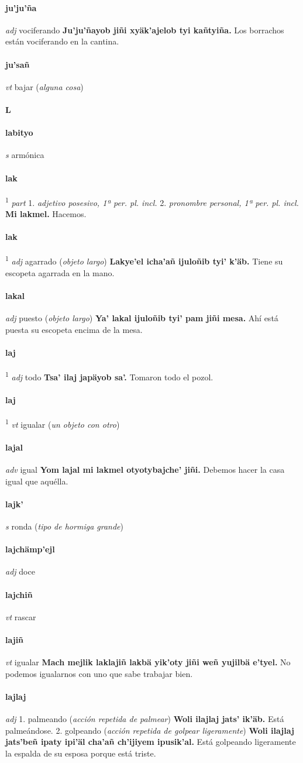 \documentclass{scrbook}
\newcommand{\entry}[1]{\paragraph{#1}}
\newcommand{\alphaletter}[1]{\addsec{#1}}
\newcommand{\onedefinition}[1]{#1.}
\newcommand{\defsuperscript}[1]{\textsuperscript{1}}
\newcommand{\nontranslationdef}[1]{\textit{#1}}
\newcommand{\partofspeech}[1]{\textit{#1}}
\newcommand{\spanishtranslation}[1]{#1}
\newcommand{\clarification}[1]{(\textit{#1})}
\newcommand{\cholexample}[1]{\textbf{#1}}
\newcommand{\exampletranslation}[1]{#1}
\begin{document}
\begin{multicols}{2}
\entry{ju'ju'ña}
\partofspeech{adj}
\spanishtranslation{vociferando}
\cholexample{Ju'ju'ñayob jiñi xyäk'ajelob tyi kañtyiña.}
\exampletranslation{Los borrachos están vociferando en la cantina.}

\entry{ju'sañ}
\partofspeech{vt}
\spanishtranslation{bajar}
\clarification{alguna cosa}

\entry{L}
\alphaletter{L}

\entry{labityo}
\partofspeech{s}
\spanishtranslation{armónica}

\entry{lak}
\defsuperscript{1}
\partofspeech{part}
\onedefinition{1}
\nontranslationdef{adjetivo posesivo, 1ª per. pl. incl.}
\onedefinition{2}
\nontranslationdef{pronombre personal, 1ª per. pl. incl.}
\cholexample{Mi lakmel.}
\exampletranslation{Hacemos.}

\entry{lak}
\defsuperscript{2}
\partofspeech{adj}
\spanishtranslation{agarrado}
\clarification{objeto largo}
\cholexample{Lakye'el icha'añ ijuloñib tyi' k'äb.}
\exampletranslation{Tiene su escopeta agarrada en la mano.}

\entry{lakal}
\partofspeech{adj}
\spanishtranslation{puesto}
\clarification{objeto largo}
\cholexample{Ya' lakal ijuloñib tyi' pam jiñi mesa.}
\exampletranslation{Ahí está puesta su escopeta encima de la mesa.}

\entry{laj}
\defsuperscript{1}
\partofspeech{adj}
\spanishtranslation{todo}
\cholexample{Tsa' ilaj japäyob sa'.}
\exampletranslation{Tomaron todo el pozol.}

\entry{laj}
\defsuperscript{2}
\partofspeech{vt}
\spanishtranslation{igualar}
\clarification{un objeto con otro}

\entry{lajal}
\partofspeech{adv}
\spanishtranslation{igual}
\cholexample{Yom lajal mi lakmel otyotybajche' jiñi.}
\exampletranslation{Debemos hacer la casa igual que aquélla.}

\entry{lajk'}
\partofspeech{s}
\spanishtranslation{ronda}
\clarification{tipo de hormiga grande}

\entry{lajchämp'ejl}
\partofspeech{adj}
\spanishtranslation{doce}

\entry{lajchiñ}
\partofspeech{vt}
\spanishtranslation{rascar}

\entry{lajiñ}
\partofspeech{vt}
\spanishtranslation{igualar}
\cholexample{Mach mejlik laklajiñ lakbä yik'oty jiñi weñ yujilbä e'tyel.}
\exampletranslation{No podemos igualarnos con uno que sabe trabajar bien.}

\entry{lajlaj}
\partofspeech{adj}
\onedefinition{1}
\spanishtranslation{palmeando}
\clarification{acción repetida de palmear}
\cholexample{Woli ilajlaj jats' ik'äb.}
\exampletranslation{Está palmeándose.}
\onedefinition{2}
\spanishtranslation{golpeando}
\clarification{acción repetida de golpear ligeramente}
\cholexample{Woli ilajlaj jats'beñ ipaty ipi'äl cha'añ ch'ijiyem ipusik'al.}
\exampletranslation{Está golpeando ligeramente la espalda de su esposa porque está triste.}


\end{multicols}
\end{document}
